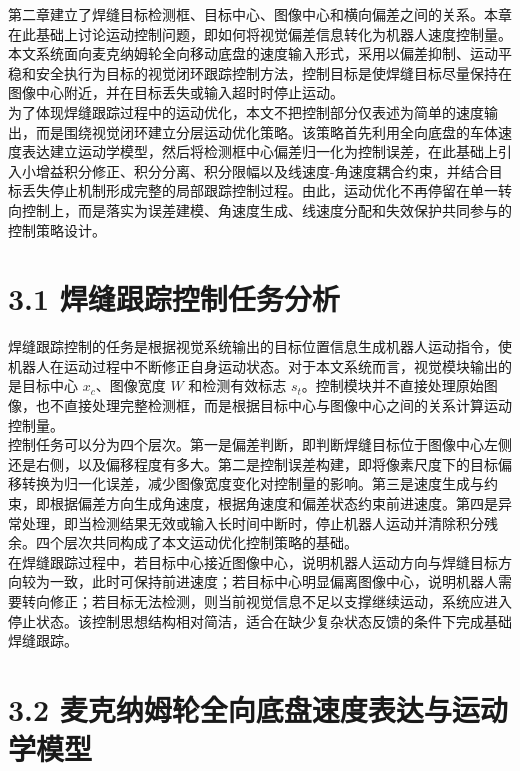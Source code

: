 \documentclass[UTF8,a4paper,12pt]{ctexrep}
\begin{document}
第二章建立了焊缝目标检测框、目标中心、图像中心和横向偏差之间的关系。本章在此基础上讨论运动控制问题，即如何将视觉偏差信息转化为机器人速度控制量。本文系统面向麦克纳姆轮全向移动底盘的速度输入形式，采用以偏差抑制、运动平稳和安全执行为目标的视觉闭环跟踪控制方法，控制目标是使焊缝目标尽量保持在图像中心附近，并在目标丢失或输入超时时停止运动。\\

为了体现焊缝跟踪过程中的运动优化，本文不把控制部分仅表述为简单的速度输出，而是围绕视觉闭环建立分层运动优化策略。该策略首先利用全向底盘的车体速度表达建立运动学模型，然后将检测框中心偏差归一化为控制误差，在此基础上引入小增益积分修正、积分分离、积分限幅以及线速度-角速度耦合约束，并结合目标丢失停止机制形成完整的局部跟踪控制过程。由此，运动优化不再停留在单一转向控制上，而是落实为误差建模、角速度生成、线速度分配和失效保护共同参与的控制策略设计。\\

\section{3.1 焊缝跟踪控制任务分析}

焊缝跟踪控制的任务是根据视觉系统输出的目标位置信息生成机器人运动指令，使机器人在运动过程中不断修正自身运动状态。对于本文系统而言，视觉模块输出的是目标中心 $x_c$、图像宽度 $W$ 和检测有效标志 $s_t$。控制模块并不直接处理原始图像，也不直接处理完整检测框，而是根据目标中心与图像中心之间的关系计算运动控制量。\\

控制任务可以分为四个层次。第一是偏差判断，即判断焊缝目标位于图像中心左侧还是右侧，以及偏移程度有多大。第二是控制误差构建，即将像素尺度下的目标偏移转换为归一化误差，减少图像宽度变化对控制量的影响。第三是速度生成与约束，即根据偏差方向生成角速度，根据角速度和偏差状态约束前进速度。第四是异常处理，即当检测结果无效或输入长时间中断时，停止机器人运动并清除积分残余。四个层次共同构成了本文运动优化控制策略的基础。\\

在焊缝跟踪过程中，若目标中心接近图像中心，说明机器人运动方向与焊缝目标方向较为一致，此时可保持前进速度；若目标中心明显偏离图像中心，说明机器人需要转向修正；若目标无法检测，则当前视觉信息不足以支撑继续运动，系统应进入停止状态。该控制思想结构相对简洁，适合在缺少复杂状态反馈的条件下完成基础焊缝跟踪。\\

\section{3.2 麦克纳姆轮全向底盘速度表达与运动学模型}
\end{document}

